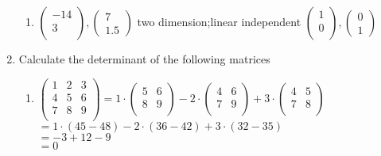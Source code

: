 \documentclass{article}
\begin{document}
\begin{enumerate}
\begin{enumerate}
    \item \begin{math} \begin{pmatrix} -14 \\ 3\\ \end{pmatrix},
    \begin{pmatrix} 7\\ 1.5 \end{pmatrix}
    \end{math}
    two dimension;linear independent
    \begin{math} \begin{pmatrix} 1 \\ 0\\ \end{pmatrix} ,
    \begin{pmatrix} 0\\ 1 \end{pmatrix} \end{math}
    
    \end{enumerate}
    
\item Calculate the determinant of the following matrices
    \begin{enumerate}
    \item
    \begin{math}
    \begin{pmatrix}
    1 & 2 & 3 \\ 
    4 & 5 & 6 \\
    7 & 8 & 9 \\ 
    \end{pmatrix}
    = 1 \cdot \begin{pmatrix} 5&6 \\ 8&9 \\ \end{pmatrix} - 2 \cdot \begin{pmatrix} 4&6 \\ 7&9 \\ \end{pmatrix} + 3\cdot\begin{pmatrix} 4&5 \\ 7&8 \\ \end{pmatrix}
    \end{math}
    \\$=1\cdot (45-48)-2\cdot (36-42) +3\cdot (32-35)$
    \\$=-3+12-9$
    \\$=0$
    

\end{enumerate}
\end{enumerate}
\end{document}
